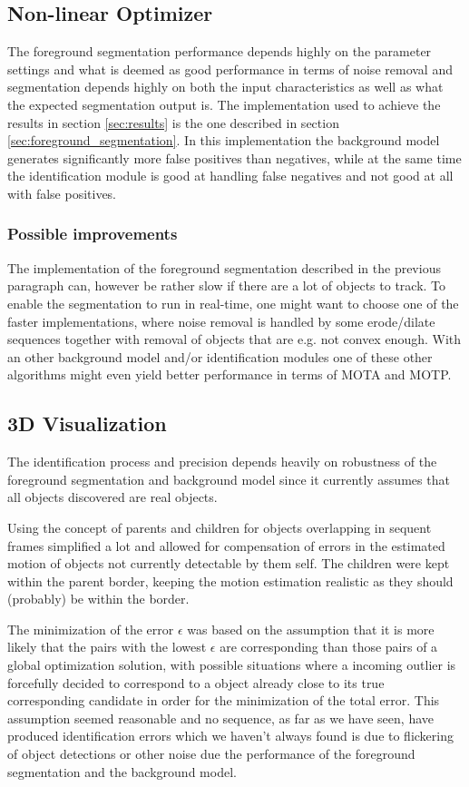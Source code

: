 \subsection{Non-linear Optimizer}
The foreground segmentation performance depends highly on the parameter settings and what is deemed as good performance in terms of noise removal and segmentation depends highly on both the input characteristics as well as what the expected segmentation output is. The implementation used to achieve the results in section \ref{sec:results}  is the one  described in section \ref{sec:foreground_segmentation}. In this implementation the background model generates significantly more false positives than negatives, while at the same time the identification module is good at handling false negatives and not good at all with false positives. 

\subsubsection{Possible improvements}
The implementation of the foreground segmentation described in the previous paragraph can, however be rather slow if there are a lot of objects to track. To enable the segmentation to run in real-time, one might want to choose one of the faster implementations, where noise removal is handled by some erode/dilate sequences together with removal of objects that are e.g. not convex enough. With an other background model and/or identification modules one of these other algorithms might even yield better performance in terms of MOTA and MOTP.

\pagebreak
\subsection{3D Visualization}
The identification process and precision depends heavily on robustness of the foreground segmentation and background model since it currently assumes that all objects discovered are real objects.

Using the concept of parents and children for objects overlapping in sequent frames simplified a lot and allowed for compensation of errors in the estimated motion of objects not currently detectable by them self. The children were kept within the parent border, keeping the motion estimation realistic as they should (probably) be within the border.

The minimization of the error $\epsilon$ was based on the assumption that it is more likely that the pairs with the lowest $\epsilon$ are corresponding than those pairs of a global optimization solution, with possible situations where a incoming outlier is forcefully decided to correspond to a object already close to its true corresponding candidate in order for the minimization of the total error. This assumption seemed reasonable and no sequence, as far as we have seen, have produced identification errors which we haven't always found is due to flickering of object detections or other noise due the performance of the foreground segmentation and the background model.

